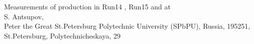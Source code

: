 \begin{titlepage}
    \begin{center}
        {
			\LARGE Measurements of \kstar production in Run14 \HeAu, Run15 \pAl and \pAu at \snntwohundred
        } \\
        \vspace{15mm}
				S. Antsupov, \\%
        \vspace{1cm}
        Peter the Great St.Petersburg Polytechnic University (SPbPU),
        Russia, 195251, St.Petersburg, Polytechnicheskaya, 29\\
    \end{center}
    \vspace{2cm}
    \date{today}
    \vspace{2cm}
    \begin{abstract}
       This analysis note presents analysis procedures for estimation of invariant \pT spectra and nuclear modification factors of $(K^{*0}(892) + (\bar{K}^{*0}(892))/2$ mesons as functions of \pT in PHENIX Run14 \HeAu, Run15p \pAl and \pAu collision systems at \snntwohundred.
    \end{abstract}
\end{titlepage}
